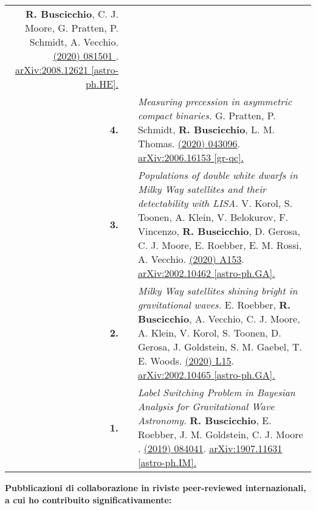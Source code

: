 {\begin{longtable}{rp{0.3cm}p{15.8cm}}
\newline{}
\textbf{R. Buscicchio}, C. J. Moore, G. Pratten, P. Schmidt, A. Vecchio.
\newline{}
\href{https://journals.aps.org/prd/abstract/10.1103/PhysRevD.102.081501}{\prd 102 (2020) 081501 }. \href{https://arxiv.org/abs/2008.12621}{arXiv:2008.12621 [astro-ph.HE].}
\vspace{0.09cm}\\
%
\textbf{4.} & & \textit{Measuring precession in asymmetric compact binaries.}
\newline{}
G. Pratten, P. Schmidt, \textbf{R. Buscicchio}, L. M. Thomas.
\newline{}
\href{https://journals.aps.org/prresearch/abstract/10.1103/PhysRevResearch.2.043096}{\prr 2 (2020) 043096}. \href{https://arxiv.org/abs/2006.16153}{arXiv:2006.16153 [gr-qc].}
\vspace{0.09cm}\\
%
\textbf{3.} & & \textit{Populations of double white dwarfs in Milky Way satellites and their detectability with LISA.}
\newline{}
V. Korol, S. Toonen, A. Klein, V. Belokurov, F. Vincenzo, \textbf{R. Buscicchio}, D. Gerosa, C. J. Moore, E. Roebber, E. M. Rossi, A. Vecchio.
\newline{}
\href{https://www.aanda.org/articles/aa/abs/2020/06/aa37764-20/aa37764-20.html}{\aap 638 (2020) A153}. \href{https://arxiv.org/abs/2002.10462}{arXiv:2002.10462 [astro-ph.GA].}
\vspace{0.09cm}\\
%
\textbf{2.} & & \textit{Milky Way satellites shining bright in gravitational waves.}
\newline{}
E. Roebber, \textbf{R. Buscicchio}, A. Vecchio, C. J. Moore, A. Klein, V. Korol, S. Toonen, D. Gerosa, J. Goldstein, S. M. Gaebel, T. E. Woods.
\newline{}
\href{https://iopscience.iop.org/article/10.3847/2041-8213/ab8ac9}{\apjl 894 (2020) L15}. \href{https://arxiv.org/abs/2002.10465}{arXiv:2002.10465 [astro-ph.GA].}
\vspace{0.09cm}\\
%
\textbf{1.} & & \textit{Label Switching Problem in Bayesian Analysis for Gravitational Wave Astronomy.}
\newline{}
\textbf{R. Buscicchio}, E. Roebber, J. M. Goldstein, C. J. Moore .
\newline{}
\href{https://journals.aps.org/prd/abstract/10.1103/PhysRevD.100.084041}{\prd 100 (2019) 084041}. \href{https://arxiv.org/abs/1907.11631}{arXiv:1907.11631 [astro-ph.IM].}
\vspace{0.09cm}\\
%
\end{longtable} }
\textcolor{color1}{\textbf{Pubblicazioni di collaborazione in riviste peer-reviewed internazionali, a cui ho contribuito significativamente:}}
\vspace{-0.5cm}

